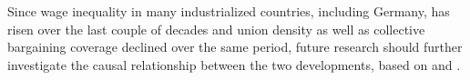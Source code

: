 Since wage inequality in many industrialized countries, including Germany, has risen over the last couple of decades and union density as well as collective bargaining coverage declined over the same period, future research should further investigate the causal relationship between the two developments, based on \cite{Antonczyk&&&:11} and \cite{Dustmann&Ludsteck&Schönberg:09}.

